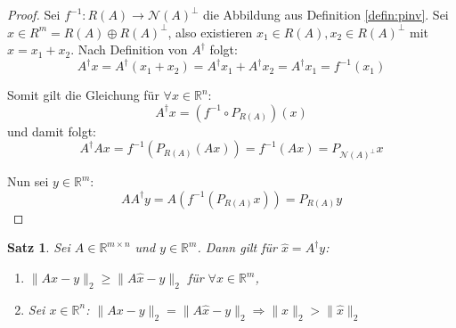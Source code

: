\documentclass{article}
\newcommand{\R}[0]{\mathbb{R}}
\theoremstyle{plain}
\newtheorem{thm}{Satz}[section]
\theoremstyle{definition}
\begin{document}
\begin{proof}\cite[S. 255, Satz 4.8.5.1]{stoer2005numerisch}
    Sei $f^{-1}: R(A) \to \mathcal{N}(A)^{\bot}$ die Abbildung aus Definition \ref{defin:pinv}. Sei $x \in R^{m} = R(A) \oplus R(A)^{\bot}$, 
    also existieren $x_1 \in R(A), x_2 \in R(A)^{\bot}$ mit $x = x_1 + x_2$. Nach Definition von $A^{\dagger}$ folgt:
    \begin{equation}
        A^{\dagger}x = A^{\dagger}(x_1 + x_2) = A^{\dagger}x_1 + A^{\dagger}x_2 = A^{\dagger}x_1 = f^{-1}(x_1)
    \end{equation}
    
    Somit gilt die Gleichung für $\forall x \in \R^n$:
    \begin{equation}
        A^{\dagger}x = (f^{-1} \circ P_{R(A)})(x)
    \end{equation}
    und damit folgt:
    \begin{equation}
        A^{\dagger}Ax = f^{-1}(P_{R(A)}(Ax)) = f^{-1}(Ax) = P_{\mathcal{N}(A)^{\bot}}x
    \end{equation}

    Nun sei $y \in \R^m$:
    \begin{equation}
        AA^{\dagger}y = A(f^{-1}(P_{R(A)}x)) = P_{R(A)}y
    \end{equation}
\end{proof}

\begin{thm}\label{thm:pinvu}
    Sei $A \in \R^{m \times n}$ und $y \in \R^m$. Dann gilt für $\hat{x} = A^{\dagger}y$:
    \begin{enumerate}
        \item $\lVert Ax - y \rVert_2 \geq \lVert A\hat{x} - y \rVert_2$ für $\forall x \in \R^m$,
        \item Sei $x \in \R^n$: $\lVert Ax - y \rVert_2 = \lVert A\hat{x} - y \rVert_2 \Rightarrow \lVert x \rVert_2 > \lVert \hat{x} \rVert_2$
    \end{enumerate}
\end{thm}
\end{document}
